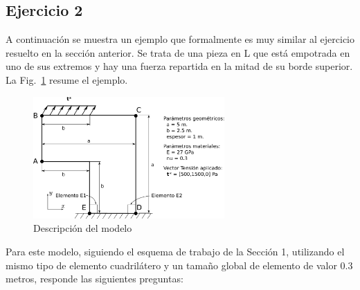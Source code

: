 \newpage
\subsection{Ejercicio  2}
A continuación se muestra un ejemplo que formalmente es muy similar al
ejercicio resuelto en la sección anterior. Se trata de una pieza en L
que está empotrada en uno de sus extremos y hay una fuerza repartida
en la mitad de su borde superior. La Fig.~\ref{figu115} resume el
ejemplo.

\begin{figure}[!h]
  \begin{center}
    \includegraphics[width=0.65\textwidth]{./body/images/imagen115}
  \end{center}
  \caption{Descripción del modelo}
  \label{figu115}
\end{figure}

Para este modelo, siguiendo el esquema de trabajo de la Sección 1,
utilizando el mismo tipo de elemento cuadrilátero y un tamaño global
de elemento de valor $0.3$ metros, responde las siguientes preguntas:


